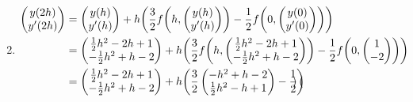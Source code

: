 \documentclass{exercise}
\begin{document}
\begin{enumerate}
\[        \]
        \item
        \begin{align*}
            \begin{pmatrix}
                y\parentheses*{2h}\\
                y'\parentheses*{2h}
            \end{pmatrix} &= \begin{pmatrix}
                y\parentheses*{h}\\
                y'\parentheses*{h}
            \end{pmatrix} + h\parentheses*{\frac{3}{2}f\parentheses*{h, \begin{pmatrix}
                y\parentheses*{h}\\
                y'\parentheses*{h}
            \end{pmatrix}} - \frac{1}{2}f\parentheses*{0, \begin{pmatrix}
                y\parentheses*{0}\\
                y'\parentheses*{0}
            \end{pmatrix}}}\\
            &= \begin{pmatrix}
                \frac{1}{2}h^2 - 2h + 1\\
                -\frac{1}{2}h^2 + h - 2
            \end{pmatrix} + h\parentheses*{\frac{3}{2}f\parentheses*{h, \begin{pmatrix}
                \frac{1}{2}h^2 - 2h + 1\\
                -\frac{1}{2}h^2 + h - 2
            \end{pmatrix}} - \frac{1}{2}f\parentheses*{0, \begin{pmatrix}
                1\\
                -2
            \end{pmatrix}}}\\
            &= \begin{pmatrix}
                \frac{1}{2}h^2 - 2h + 1\\
                -\frac{1}{2}h^2 + h - 2
            \end{pmatrix} + h\parentheses*{\frac{3}{2}\begin{pmatrix}
                -h^2 + h - 2\\
                \frac{1}{2}h^2 - h + 1
            \end{pmatrix} - \frac{1}{2}\begin{pmatrix}

\end{pmatrix}}
\end{align*}
\end{enumerate}
\end{document}
